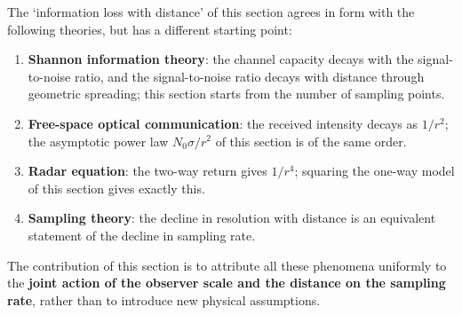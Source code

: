 \begin{remark}\label{rem:dyn_information_distance_compare}
The `information loss with distance' of this section agrees in form with the following theories, but has a different starting point:
\begin{enumerate}[label=(\roman*)]
    \item \textbf{Shannon information theory}: the channel capacity decays with the signal-to-noise ratio, and the signal-to-noise ratio decays with distance through geometric spreading; this section starts from the number of sampling points.
    \item \textbf{Free-space optical communication}: the received intensity decays as $1/r^2$; the asymptotic power law $N_0\sigma/r^2$ of this section is of the same order.
    \item \textbf{Radar equation}: the two-way return gives $1/r^4$; squaring the one-way model of this section gives exactly this.
    \item \textbf{Sampling theory}: the decline in resolution with distance is an equivalent statement of the decline in sampling rate.
\end{enumerate}
The contribution of this section is to attribute all these phenomena uniformly to the \textbf{joint action of the observer scale and the distance on the sampling rate}, rather than to introduce new physical assumptions.
\end{remark}


